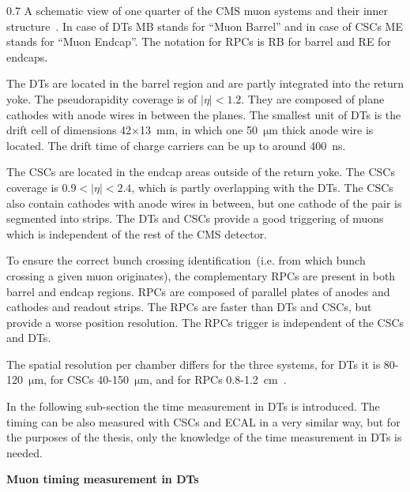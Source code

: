                  {0.7}       
                 {A schematic view of one quarter of the CMS muon systems and their inner structure~\cite{Chatrchyan:2013sba}. In case of DTs MB stands for ``Muon Barrel'' and in case of CSCs ME stands for ``Muon Endcap''. The notation for RPCs is RB for barrel and RE for endcaps. }

The DTs are located in the barrel region and are partly integrated into the return yoke.  The pseudorapidity coverage is of $|\eta|<1.2$. They are composed of plane cathodes with anode wires in between the planes. The smallest unit of DTs is the drift cell of dimensions 42$\times$13~mm, in which one 50~$\mathrm{\mu m}$ thick anode wire is located. The drift time of charge carriers can be up to around 400~ns.

The CSCs are located in the endcap areas outside of the return yoke. The CSCs coverage is $0.9<|\eta|<2.4$, which is partly overlapping with the DTs. The CSCs also contain cathodes with anode wires in between, but one cathode of the pair is segmented into strips. The DTs and CSCs provide a good triggering of muons which is independent of the rest of the CMS detector.

To ensure the correct bunch crossing identification~(i.e. from which bunch crossing a given muon originates), the complementary RPCs are present in both barrel and endcap regions. RPCs are composed of parallel plates of anodes and cathodes and readout strips. The RPCs are faster than DTs and CSCs, but provide a worse position resolution. The RPCs trigger is independent of the CSCs and DTs.  

The spatial resolution per chamber differs for the three systems, for DTs it is 80-120~$\mathrm{\mu m}$, for CSCs 40-150~$\mathrm{\mu m}$, and for RPCs 0.8-1.2~$\mathrm{cm}$~\cite{Chatrchyan:2013sba}.

In the following sub-section the time measurement in DTs is introduced. The timing can be also measured with CSCs and ECAL in a very similar way, but for the purposes of the thesis, only the knowledge of the time measurement in DTs is needed.


\textbf{Muon timing measurement in DTs~\label{sec:muonTiming}}


